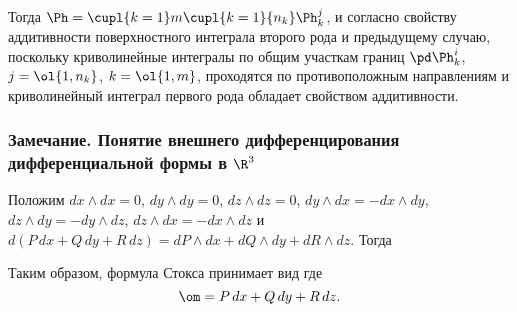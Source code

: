 \documentclass[a4paper]{article}
\begin{document}
Тогда $\Ph=\cupl{k=1}m \cupl{k=1}{n_k}\Ph^j_k$, и согласно свойству
аддитивности поверхностного интеграла второго рода и предыдущему
случаю,  поскольку криволинейные интегралы по
общим участкам границ $\pd \Ph^i_k$, $j=\ol{1,n_k}$, $k=\ol{1,m}$,
проходятся по противоположным направлениям и криволинейный интеграл
первого рода обладает свойством аддитивности.

\subsubsection{Замечание. Понятие внешнего дифференцирования
дифференциальной формы в $\R^3$}

Положим $dx\wedge dx=0$, $dy\wedge dy=0$, $dz\wedge dz=0$, $dy\wedge
dx = -dx\wedge dy$, $dz\wedge dy = -dy\wedge dz$, $dz\wedge dx =
-dx\wedge dz$ и $d(P\,dx+Q\,dy+R\,dz)=dP\wedge dx + dQ\wedge dy +
dR\wedge dz$. Тогда 

Таким образом, формула Стокса принимает вид  где $$\om=P\,dx+Q\,dy+R\,dz.$$
\end{document}
